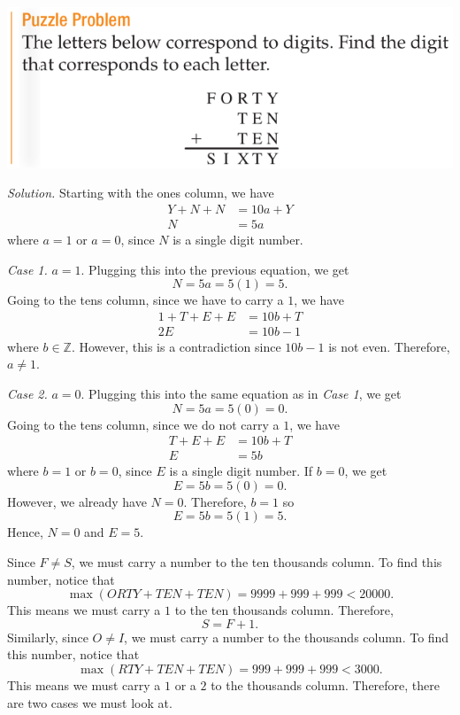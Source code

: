 \documentclass[12pt]{article}
\begin{document}
\begin{center}
\includegraphics[scale=0.6]{forty.png}
\end{center}

\noindent\textit{Solution.}
Starting with the ones column, we have
\begin{align*}
  Y+N+N&=10a+Y\\
  N&=5a
\end{align*}
where $a=1$ or $a=0$, since $N$ is a single digit number.
\vspace{20px}

\noindent\textit{Case 1.} $a=1$. Plugging this into the previous equation, we get
\[N=5a=5(1)=5.\]
Going to the tens column, since we have to carry a $1$, we have
\begin{align*}
  1+T+E+E&=10b+T\\
  2E&=10b-1
\end{align*}
where $b\in\mathbb{Z}$. However, this is a contradiction since $10b-1$ is not even. Therefore, $a\neq 1$.
\vspace{20px}

\noindent\textit{Case 2.} $a=0$. Plugging this into the same equation as in \textit{Case 1}, we get
\[N=5a=5(0)=0.\]
Going to the tens column, since we do not carry a $1$, we have
\begin{align*}
  T+E+E&=10b+T\\
  E&=5b
\end{align*}
where $b=1$ or $b=0$, since $E$ is a single digit number. If $b=0$, we get
\[E=5b=5(0)=0.\]
However, we already have $N=0$. Therefore, $b=1$ so
\[E=5b=5(1)=5.\]
Hence, $\boxed{N=0}$ and $\boxed{E=5}$.
\newpage

\noindent Since $F\neq S$, we must carry a number to the ten thousands column. To find this number, notice that
\[\max(ORTY+TEN+TEN)=9999+999+999<20000.\]
This means we must carry a $1$ to the ten thousands column. Therefore,
\[S=F+1.\]
Similarly, since $O\neq I$, we must carry a number to the thousands column. To find this number, notice that
\[\max(RTY+TEN+TEN)=999+999+999<3000.\]
This means we must carry a $1$ or a $2$ to the thousands column. Therefore, there are two cases we must look at.
\vspace{20px}
\end{document}
